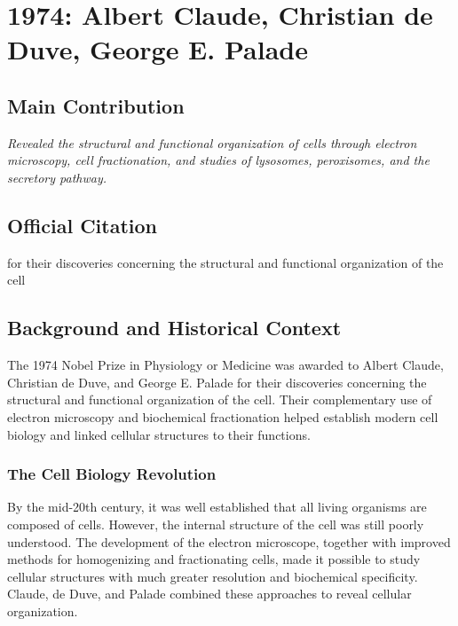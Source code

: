 \chapter[1974 --- Claude, de Duve, and Palade]{1974: Albert Claude, Christian de Duve, George E. Palade}
\label{ch:1974_Claude}

\section*{Main Contribution}

\textit{Revealed the structural and functional organization of cells through electron microscopy, cell fractionation, and studies of lysosomes, peroxisomes, and the secretory pathway.}\cite{nobel-1974,lecture-1974,lecture-duve-1974,lecture-palade-1974}

\section{Official Citation}

for their discoveries concerning the structural and functional organization of the cell

\section{Background and Historical Context}

The 1974 Nobel Prize in Physiology or Medicine was awarded to Albert Claude, Christian de Duve, and George E. Palade for their discoveries concerning the structural and functional organization of the cell. Their complementary use of electron microscopy and biochemical fractionation helped establish modern cell biology and linked cellular structures to their functions.

\subsection{The Cell Biology Revolution}

By the mid-20th century, it was well established that all living organisms are composed of cells. However, the internal structure of the cell was still poorly understood. The development of the electron microscope, together with improved methods for homogenizing and fractionating cells, made it possible to study cellular structures with much greater resolution and biochemical specificity. Claude, de Duve, and Palade combined these approaches to reveal cellular organization.

